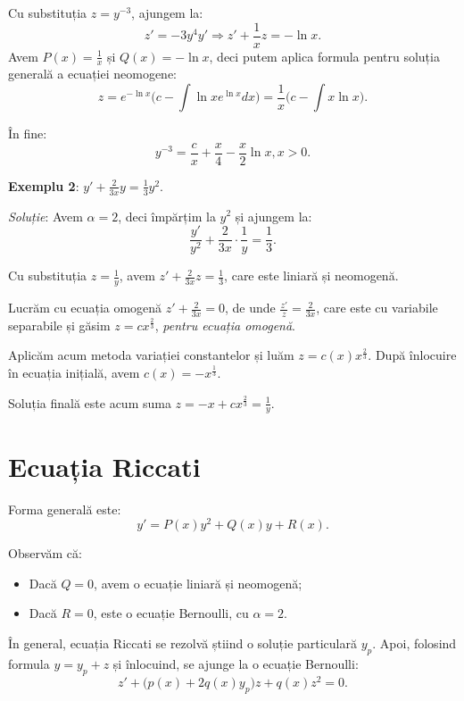 Cu substituția $z = y^{-3}$, ajungem la:
\[
  z' = - 3y^4 y' \Rightarrow z' + \frac{1}{x} z = -\ln x.
\]
Avem $P(x) = \frac{1}{x}$ și $Q(x) = -\ln x$, deci putem aplica formula pentru
soluția generală a ecuației neomogene:
\[
  z = e^{-\ln x} \Big( c - \int \ln x e^{\ln x} dx \Big) = \frac{1}{x} \Big( c - \int x \ln x \Big).
\]

În fine:
\[
  y^{-3} = \frac{c}{x} + \frac{x}{4} - \frac{x}{2} \ln x, x > 0.
\]

\vspace{1cm}

\textbf{Exemplu 2}: $y' + \frac{2}{3x}y = \frac{1}{3} y^2$.

\emph{Soluție}: Avem $\alpha = 2$, deci împărțim la $y^2$ și ajungem la:
\[
  \frac{y'}{y^2} + \frac{2}{3x} \cdot \frac{1}{y} = \frac{1}{3}.
\]

Cu substituția $z = \frac{1}{y}$, avem $z' + \frac{2}{3x} z = \frac{1}{3}$,
care este liniară și neomogenă.

Lucrăm cu ecuația omogenă $z' + \frac{2}{3x} = 0$, de unde $\frac{z'}{z} = \frac{2}{3x}$,
care este cu variabile separabile și găsim $z = cx^{\frac{2}{3}}$, \emph{pentru ecuația omogenă}.

Aplicăm acum metoda variației constantelor și luăm $z = c(x) x^{\frac{2}{3}}$. După înlocuire
în ecuația inițială, avem $c(x) = -x^{\frac{1}{3}}$.

Soluția finală este acum suma $z = -x + cx^{\frac{2}{3}} = \frac{1}{y}$.


\section{Ecuația Riccati}
\label{sec:ec-ric}

Forma generală este:
\[
  y' = P(x) y^2 + Q(x) y + R(x).
\]

Observăm că:
\begin{itemize}
\item Dacă $Q = 0$, avem o ecuație liniară și neomogenă;
\item Dacă $R = 0$, este o ecuație Bernoulli, cu $\alpha = 2$.
\end{itemize}
  
În general, ecuația Riccati se rezolvă știind o soluție particulară $y_p$. Apoi,
folosind formula $y = y_p + z$ și înlocuind, se ajunge la o ecuație Bernoulli:
\[
  z' + \big(p(x) + 2q(x) y_p\big)z + q(x) z^2 = 0.
\]

